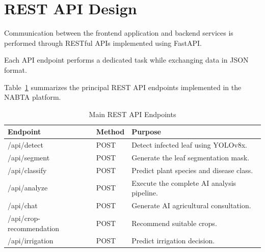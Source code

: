 \section{REST API Design}
\label{sec:api_design}

Communication between the frontend application and backend services is performed through RESTful APIs implemented using FastAPI.

Each API endpoint performs a dedicated task while exchanging data in JSON format.

Table~\ref{tab:api_endpoints} summarizes the principal REST API endpoints implemented in the NABTA platform.

\begin{table}[H]
\centering
\caption{Main REST API Endpoints}
\label{tab:api_endpoints}
\renewcommand{\arraystretch}{1.35}

\begin{tabularx}{\textwidth}{>{\raggedright\arraybackslash}p{4cm}>{\raggedright\arraybackslash}p{3cm}X}

\toprule

\textbf{Endpoint} &
\textbf{Method} &
\textbf{Purpose}

\\

\midrule

/api/detect &
POST &
Detect infected leaf using YOLOv8x.

\\

/api/segment &
POST &
Generate the leaf segmentation mask.

\\

/api/classify &
POST &
Predict plant species and disease class.

\\

/api/analyze &
POST &
Execute the complete AI analysis pipeline.

\\

/api/chat &
POST &
Generate AI agricultural consultation.

\\

/api/crop-recommendation &
POST &
Recommend suitable crops.

\\

/api/irrigation &
POST &
Predict irrigation decision.


\end{tabularx}
\end{table}
